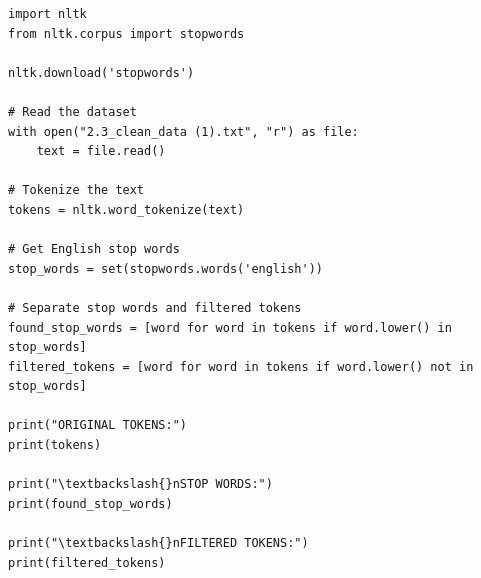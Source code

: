 \documentclass[12pt,a4paper,oneside]{report}
\begin{document}
\begin{Verbatim}[commandchars=\\\{\},breaklines=true,breakanywhere=true,fontsize=\scriptsize,frame=leftline,framesep=2mm,rulecolor=\color{gray}]
import nltk
from nltk.corpus import stopwords

nltk.download('stopwords')

# Read the dataset
with open("2.3_clean_data (1).txt", "r") as file:
    text = file.read()

# Tokenize the text
tokens = nltk.word_tokenize(text)

# Get English stop words
stop_words = set(stopwords.words('english'))

# Separate stop words and filtered tokens
found_stop_words = [word for word in tokens if word.lower() in stop_words]
filtered_tokens = [word for word in tokens if word.lower() not in stop_words]

print("ORIGINAL TOKENS:")
print(tokens)

print("\textbackslash{}nSTOP WORDS:")
print(found_stop_words)

print("\textbackslash{}nFILTERED TOKENS:")
print(filtered_tokens)
\end{Verbatim}
\end{document}
